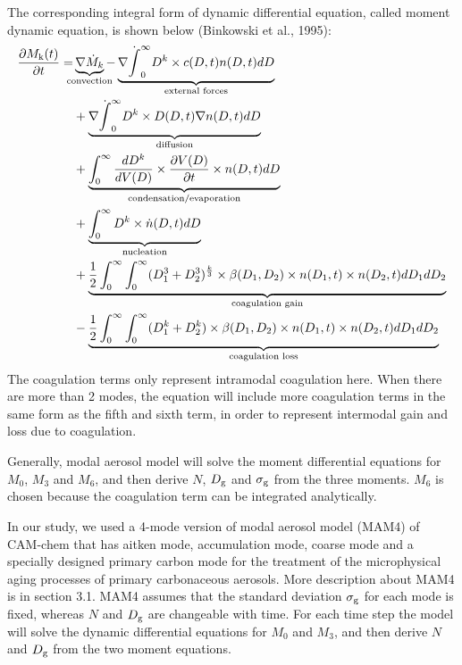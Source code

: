 \documentclass[12pt]{article}
\begin{document}
	The corresponding integral form of dynamic differential equation, called moment dynamic equation, is shown below (Binkowski et al., 1995):
	 \begin{align}
	 \begin{split}
	 \frac{\partial M_\text{k}(t)}{\partial t} = &
	 \underbrace{\nabla \dot M_k}_\text{\clap{convection}} - \underbrace{\nabla \dot \int_{0}^{\infty}D^k\times c(D,t)n(D,t)dD}_\text{\clap{external forces}} \\
	 &+ \underbrace{\nabla \dot \int_{0}^{\infty}D^k\times D(D,t)\nabla n(D,t)dD}_\text{\clap{diffusion}} \\
	 &+ \underbrace{\int_{0}^{\infty}\frac{dD^k}{dV(D)}\times \frac{\partial V(D)}{\partial t}\times n(D,t)dD}_\text{\clap{condensation/evaporation}} \\
	 &+ \underbrace{\int_{0}^{\infty}D^k\times \dot n(D,t)dD}_\text{\clap{nucleation}} \\
	 &+ \underbrace{\frac{1}{2}\int_{0}^{\infty}\int_{0}^{\infty}
	 	(D_{1}^3+D_{2}^3)^{\frac{k}{3}}\times \beta(D_{1},D_2)\times n(D_1, t)\times n(D_2,t) dD_1dD_2}_\text{\clap{coagulation gain}} \\
	 &-\underbrace{\frac{1}{2}\int_{0}^{\infty}\int_{0}^{\infty}
	 	(D_{1}^k+D_{2}^k)\times \beta(D_{1},D_2)\times n(D_1, t)\times n(D_2,t) dD_1dD_2}_\text{\clap{coagulation loss}}
	 \end{split}
	 \end{align}
		The coagulation terms only represent intramodal coagulation here. When there are more than 2 modes, the equation will include more coagulation terms in the same form as the fifth and sixth term, in order to represent intermodal gain and loss due to coagulation.
	
		Generally, modal aerosol model will solve the moment differential equations for $M_0$, $M_3$ and $M_6$, and then derive $N$, $D_{\rm g}$ and $\sigma_{\rm g}$ from the three moments. $M_6$ is chosen because the coagulation term can be integrated analytically. 
	
		In our study, we used a 4-mode version of modal aerosol model (MAM4) of CAM-chem that has aitken mode, accumulation mode, coarse mode and a specially designed primary carbon mode for the treatment of the microphysical aging processes of primary carbonaceous aerosols. More description about MAM4 is in section 3.1. MAM4 assumes that the standard deviation $\sigma_{\rm g}$ for each mode is fixed, whereas $N$ and $D_{\rm g}$ are changeable with time. For each time step the model will solve the dynamic differential equations for $M_0$ and $M_3$, and then derive $N$ and $D_{\rm g}$ from the two moment equations.
	
\end{document}
